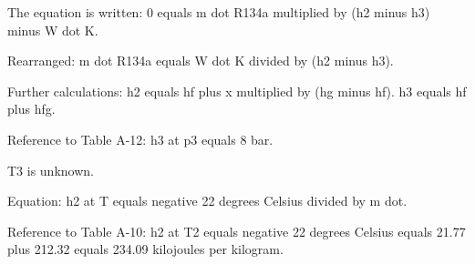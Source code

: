 The equation is written:  
0 equals m dot R134a multiplied by (h2 minus h3) minus W dot K.  

Rearranged:  
m dot R134a equals W dot K divided by (h2 minus h3).  

Further calculations:  
h2 equals hf plus x multiplied by (hg minus hf).  
h3 equals hf plus hfg.  

Reference to Table A-12:  
h3 at p3 equals 8 bar.  

T3 is unknown.  

Equation:  
h2 at T equals negative 22 degrees Celsius divided by m dot.  

Reference to Table A-10:  
h2 at T2 equals negative 22 degrees Celsius equals 21.77 plus 212.32 equals 234.09 kilojoules per kilogram.